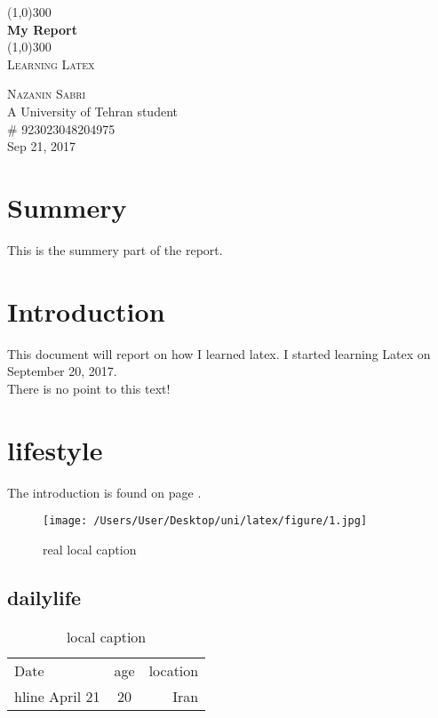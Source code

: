 \documentclass{article}
\begin{document}
\begin{titlepage}
	\begin{center}

	\line(1,0){300}\\
	[0.25in]
	\huge{\bfseries My Report}\\
	[2mm]
	\line(1,0){300}\\
	[0.75cm]
	\textsc{\large Learning Latex}\\
	[10cm]
	\end{center}

	\begin{flushright}
	\textsc{\large Nazanin Sabri\\}
	A University of Tehran student\\
	\# 923023048204975\\
	Sep 21, 2017
	\end{flushright}

\end{titlepage}


\section*{Summery}
This is the summery part of the report. 
\cleardoublepage


\tableofcontents
\thispagestyle{empty}
\cleardoublepage

\setcounter{page}{1}

\section{Introduction}\label{sec:intro}
This document will report on how I learned latex. I started learning Latex on September 20, 2017.\\ There is no point to this text!\\
\lipsum[1]

\newpage
\section{lifestyle}\label{sec:lifestyle}
The introduction is found on page \pageref{sec:intro}.


\lipsum[2]
\begin{figure}
	\centering 
	\texttt{[image: /Users/User/Desktop/uni/latex/figure/1.jpg]}
	\caption[Optional caption]{real local caption}
\end{figure}


\subsection{dailylife}
\lipsum[1]



\begin{table}[H]
	\centering 
	\label{tab:thisIsMyTable}
	\caption[this is optional caption, without refrencing]{local caption}
	\begin{tabular}{l c r}
		Date & age & location \\hline
		April 21 & 20 & Iran \\
	\end{tabular}
\end{table}
\end{document}
